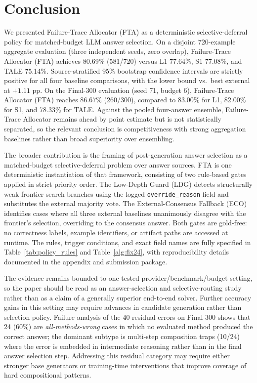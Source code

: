 \section{Conclusion}
\label{sec:conclusion}

We presented Failure-Trace Allocator (FTA) as a deterministic selective-deferral
policy for matched-budget LLM answer selection.
On a disjoint 720-example aggregate evaluation (three independent seeds, zero overlap),
Failure-Trace Allocator (FTA) achieves 80.69\% (581/720) versus L1 77.64\%, S1 77.08\%, and TALE 75.14\%.
Source-stratified 95\% bootstrap confidence intervals are strictly positive for all four
baseline comparisons, with the lower bound vs.\ best external at $+1.11$ pp.
On the Final-300 evaluation (seed 71, budget 6), Failure-Trace Allocator (FTA) reaches 86.67\% (260/300),
compared to 83.00\% for L1, 82.00\% for S1, and 78.33\% for TALE.
Against the pooled four-answer ensemble, Failure-Trace Allocator remains ahead by point estimate but is not statistically separated, so the relevant conclusion is competitiveness with strong aggregation baselines rather than broad superiority over ensembling.

The broader contribution is the framing of post-generation answer selection as a
matched-budget selective-deferral problem over answer sources. FTA is one
deterministic instantiation of that framework, consisting of two rule-based gates
applied in strict priority order.
The Low-Depth Guard (LDG) detects structurally weak frontier search branches using the
logged \texttt{override\_reason} field and substitutes the external majority vote.
The External-Consensus Fallback (ECO) identifies cases where all three external
baselines unanimously disagree with the frontier's selection, overriding to the
consensus answer.
Both gates are gold-free: no correctness labels, example identifiers, or artifact
paths are accessed at runtime.
The rules, trigger conditions, and exact field names are fully specified in
Table~\ref{tab:policy_rules} and Table~\ref{alg:fix24}, with reproducibility
details documented in the appendix and submission package.

The evidence remains bounded to one tested provider/benchmark/budget setting, so
the paper should be read as an answer-selection and selective-routing study rather
than as a claim of a generally superior end-to-end solver. Further accuracy gains
in this setting may require advances in candidate generation rather than selection
policy.
Failure analysis of the 40 residual errors on Final-300 shows that 24 (60\%) are
\textit{all-methods-wrong} cases in which no evaluated method produced the correct answer;
the dominant subtype is multi-step composition traps (10/24) where the error is
embedded in intermediate reasoning rather than in the final answer selection step.
Addressing this residual category may require either stronger base generators or
training-time interventions that improve coverage of hard compositional patterns.
